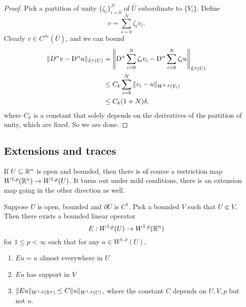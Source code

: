 \documentclass[a4paper]{article}
\begin{document}
\begin{proof}
%
  Pick a partition of unity $\{\zeta_i\}_{i = 0}^N$ of $\bar{U}$ subordinate to $\{V_i\}$. Define
  \[
    v = \sum_{i = 0}^N \zeta_i v_i.
  \]
  Clearly $v \in C^\infty(\bar{U})$, and we can bound
  \begin{align*}
    \|D^\alpha v - \mathrm{D}^\alpha u\|_{L^p(U)} &= \left\lVert \mathrm{D}^\alpha \sum_{i = 0}^N \zeta_i v_i - \mathrm{D}^\alpha \sum_{i = 0}^N \zeta_i u\right\rVert_{L^p(U)}\\
    &\leq C_k \sum_{i = 0}^N \|v_i - u\|_{W^{k. p}(V_i)}\\
    &\leq C_k(1 + N)\delta,
  \end{align*}
  where $C_k$ is a constant that solely depends on the derivatives of the partition of unity, which are fixed. So we are done.
\end{proof}

\subsection{Extensions and traces}
If $U \subseteq \mathbb{R}^n$ is open and bounded, then there is of course a restriction map $W^{1, p}(\mathbb{R}^n) \to W^{1, p}(U)$. It turns out under mild conditions, there is an extension map going in the other direction as well.

\begin{thm}
  Suppose $U$ is open, bounded and $\partial U$ is $C^1$. Pick a bounded $V$ such that $U \Subset V$. Then there exists a bounded linear operator
  \[
    E: W^{1, p}(U) \to W^{1. p}(\mathbb{R}^n)
  \]
  for $1 \leq p < \infty$ such that for any $u \in W^{1, p}(U)$,
  \begin{enumerate}
    \item $Eu = u$ almost everywhere in $U$
    \item $Eu$ has support in $V$
    \item $\|Eu\|_{W^{1, p}(\mathbb{R}^n)} \leq C \|u\|_{W^{1, p}(U)}$, where the constant $C$ depends on $U, V, p$ but not $u$.
  \end{enumerate}
\end{thm}
\end{document}
